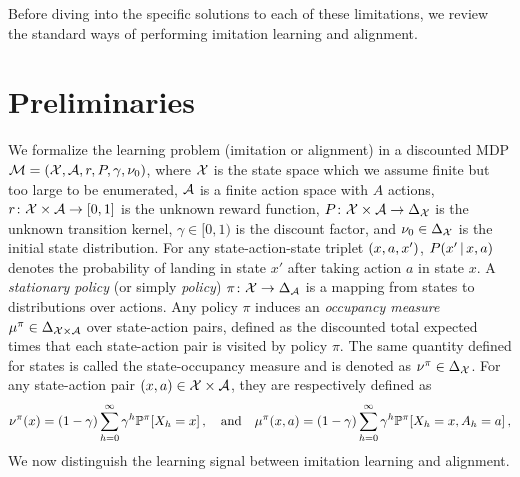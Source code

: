 \documentclass{article}
\begin{document}
Before diving into the specific solutions to each of these limitations, we review the standard ways of performing imitation learning 
and alignment.

\section{Preliminaries}
 We formalize the learning problem (imitation or alignment) in a discounted MDP $\cM = \spr*{\cX, \cA, r, P, \gamma, \initial}$, where $\cX$ is the state space which we assume finite but too large to be enumerated, $\cA$ is a finite action space with $A$ actions, $r\colon \cX \times \cA \rightarrow \sbr*{0, 1}$ is the unknown reward function, $P\colon \cX \times \cA \rightarrow \Delta_{\cX}$ is the unknown transition kernel, $\gamma \in [0, 1)$ is the discount factor, and $\initial \in \Delta_{\cX}$ is the initial state distribution. For any state-action-state triplet $\spr*{x, a, x'}$, $P \spr*{x' \given x, a}$ denotes the probability of landing in state $x'$ after taking action $a$ in state $x$. A \emph{stationary policy} (or simply \emph{policy}) $\pi\colon \cX \rightarrow \Delta_{\cA}$ is a mapping from states to distributions over actions. %
Any policy $\pi$ induces an \emph{occupancy measure}  $\mu^\pi \in \Delta_{\cX\times\cA}$ over state-action pairs, defined as the discounted total expected times that each state-action pair 
is visited by policy $\pi$. 
The same quantity defined for states is called the state-occupancy measure and is denoted as $\nu^\pi \in \Delta_{\cX}$.
For any state-action pair $\spr*{x, a} \in \cX \times \cA$, they are respectively defined as
\begin{equation*}
    \nu^\pi \spr*{x} = \spr*{1 - \gamma} \sum^\infty_{h=0} \gamma^h \bbP^\pi \sbr*{X_h = x}\,, \quad \text{and} \quad 
    \mu^\pi \spr*{x, a} = \spr*{1 - \gamma} \sum^\infty_{h=0} \gamma^h \bbP^\pi \sbr*{X_h = x, A_h = a}\,, 
\end{equation*}
We now distinguish the learning signal between imitation learning and alignment.
\end{document}
